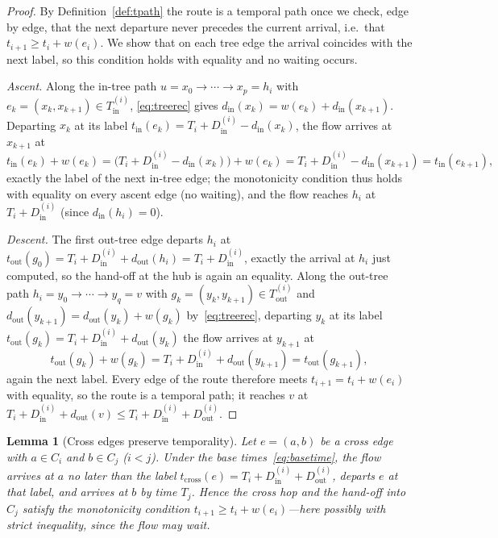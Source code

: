 \documentclass[11pt]{article}
\newtheorem{lemma}{Lemma}
\theoremstyle{definition}
\theoremstyle{remark}
\newcommand{\Tin}{T^{(i)}_{\mathrm{in}}}
\newcommand{\Tout}{T^{(i)}_{\mathrm{out}}}
\newcommand{\din}{d_{\mathrm{in}}}
\newcommand{\dout}{d_{\mathrm{out}}}
\newcommand{\Din}{D^{(i)}_{\mathrm{in}}}
\newcommand{\Dout}{D^{(i)}_{\mathrm{out}}}
\begin{document}
\begin{proof}
By Definition~\ref{def:tpath} the route is a temporal path once we check, edge by edge, that the next
departure never precedes the current arrival, i.e.\ that $t_{i+1}\ge t_i+w(e_i)$. We show that on each
tree edge the arrival coincides with the next label, so this condition holds with equality and no
waiting occurs.

\emph{Ascent.} Along the in-tree path $u=x_0\to\cdots\to x_p=h_i$ with $e_k=(x_k,x_{k+1})\in\Tin$,
\eqref{eq:treerec} gives $\din(x_k)=w(e_k)+\din(x_{k+1})$. Departing $x_k$ at its label
$t_{\mathrm{in}}(e_k)=T_i+\Din-\din(x_k)$, the flow arrives at $x_{k+1}$ at
\[
  t_{\mathrm{in}}(e_k)+w(e_k)=\bigl(T_i+\Din-\din(x_k)\bigr)+w(e_k)=T_i+\Din-\din(x_{k+1})=t_{\mathrm{in}}(e_{k+1}),
\]
exactly the label of the next in-tree edge; the monotonicity condition thus holds with equality on
every ascent edge (no waiting), and the flow reaches $h_i$ at $T_i+\Din$ (since $\din(h_i)=0$).

\emph{Descent.} The first out-tree edge departs $h_i$ at
$t_{\mathrm{out}}(g_0)=T_i+\Din+\dout(h_i)=T_i+\Din$, exactly the arrival at $h_i$ just computed, so the
hand-off at the hub is again an equality. Along the out-tree path $h_i=y_0\to\cdots\to y_q=v$ with
$g_k=(y_k,y_{k+1})\in\Tout$ and $\dout(y_{k+1})=\dout(y_k)+w(g_k)$ by~\eqref{eq:treerec}, departing
$y_k$ at its label $t_{\mathrm{out}}(g_k)=T_i+\Din+\dout(y_k)$ the flow arrives at $y_{k+1}$ at
\[
  t_{\mathrm{out}}(g_k)+w(g_k)=T_i+\Din+\dout(y_{k+1})=t_{\mathrm{out}}(g_{k+1}),
\]
again the next label. Every edge of the route therefore meets $t_{i+1}=t_i+w(e_i)$ with equality, so
the route is a temporal path; it reaches $v$ at $T_i+\Din+\dout(v)\le T_i+\Din+\Dout$.
\end{proof}

\begin{lemma}[Cross edges preserve temporality]\label{lem:cross}
Let $e=(a,b)$ be a cross edge with $a\in C_i$ and $b\in C_j$ ($i<j$). Under the base
times~\eqref{eq:basetime}, the flow arrives at $a$ no later than the label $t_{\mathrm{cross}}(e)=T_i+\Din+\Dout$,
departs $e$ at that label, and arrives at $b$ by time $T_j$. Hence the cross hop and the hand-off into
$C_j$ satisfy the monotonicity condition $t_{i+1}\ge t_i+w(e_i)$---here possibly with strict inequality,
since the flow may wait.
\end{lemma}
\end{document}
